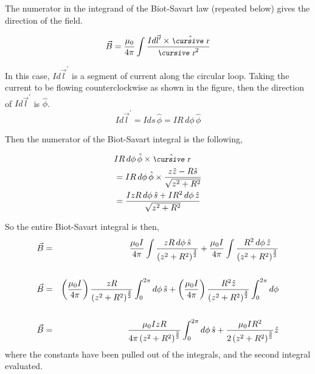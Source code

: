 \documentclass[12pt]{article}
\begin{document}
\begin{flushleft}
The numerator in the integrand of the Biot-Savart law (repeated below) gives the direction of the field.

\begin{equation*}
\vec{B}  = \frac{ \mu_{0} }{4\pi} \int \frac{ Id\vec{l}^{\prime} \times  \hat{\text{\small\slshape\cursive r}}}{\text{\small\slshape\cursive r}^{2}}
\end{equation*}


In this case, $Id\vec{l}^{\prime}$ is a segment of current along the circular loop.  Taking the current to be flowing counterclockwise as shown in the figure, then the direction of $Id\vec{l}^{\prime}$ is $\hat{\phi}$.  
\[
Id\vec{l}^{\prime}=Ids\, \hat{\phi} = I R \, d\phi \, \hat{\phi}
\]

Then the numerator of the Biot-Savart integral is the following,

\begin{equation*}
\begin{aligned}
& I R \, d\phi \, \hat{\phi} \times \hat{\text{\small\slshape\cursive r}} \\
& =  I R \, d\phi \, \hat{\phi} \times  \frac{z\hat{z}-R\hat{s}}{\sqrt{ z^{2}+R^{2}}} \\
& = \frac{ I z R \, d\phi \, \hat{s}  + I  R^{2} \, d\phi \, \hat{z} } { \sqrt{ z^{2}+R^{2}} }
\end{aligned}
\end{equation*}

So the entire Biot-Savart integral is then,
\vspace{.1in}
\begin{eqnarray}
\vec{B} & = & \frac{ \mu_{0} I}{4\pi} \int \frac{ z R \, d\phi \, \hat{s} } { \left( z^{2}+R^{2} \right)^{\frac{3}{2}} } + \frac{ \mu_{0} I}{4\pi} \int \frac{R^{2} \, d\phi \, \hat{z} } { \left( z^{2}+R^{2} \right)^{\frac{3}{2}} } \nonumber \\
\vspace{.1in} \nonumber \\
\vec{B} & = & \left( \frac{ \mu_{0} I}{4\pi} \right) \frac{zR}{\left( z^{2}+R^{2} \right)^{\frac{3}{2}} } \int_{0}^{2\pi} d\phi \, \hat{s}  + \left( \frac{ \mu_{0} I}{4\pi}\right) \frac{R^{2}\hat{z}}{\left( z^{2}+R^{2} \right)^{\frac{3}{2}} }\int_{0}^{2\pi} d\phi  \nonumber \\
\vspace{.1in} \nonumber \\
\vec{B} & = & \frac{ \mu_{0} IzR}{4\pi \left( z^{2}+R^{2} \right)^{\frac{3}{2}}} \int_{0}^{2\pi} d\phi \, \hat{s}  + \frac{ \mu_{0} I R^{2}}{2\left( z^{2}+R^{2} \right)^{\frac{3}{2}}} \hat{z}
\label{eq:twobiotsavart}
\end{eqnarray}
where the constants have been pulled out of the integrals, and the second integral evaluated.  


\end{flushleft}
\end{document}
